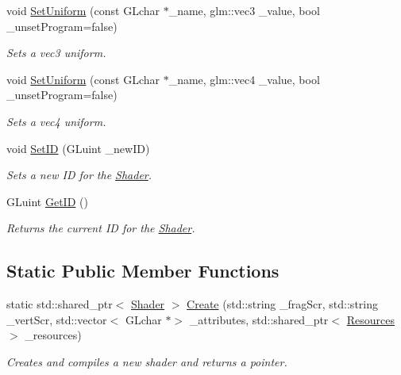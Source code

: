 \begin{DoxyCompactItemize}
void \hyperlink{classfrontier_1_1_shader_aad5527a4747c3dc7692a8cdaede42537}{Set\+Uniform} (const G\+Lchar $\ast$\+\_\+name, glm\+::vec3 \+\_\+value, bool \+\_\+unset\+Program=false)
\begin{DoxyCompactList}\small\item\em Sets a vec3 uniform. \end{DoxyCompactList}\item 
void \hyperlink{classfrontier_1_1_shader_a2f1cc89390360779c0df68f2d10efff1}{Set\+Uniform} (const G\+Lchar $\ast$\+\_\+name, glm\+::vec4 \+\_\+value, bool \+\_\+unset\+Program=false)
\begin{DoxyCompactList}\small\item\em Sets a vec4 uniform. \end{DoxyCompactList}\item 
void \hyperlink{classfrontier_1_1_shader_a2485d4542cb287c9831558ed1cbd0d13}{Set\+ID} (G\+Luint \+\_\+new\+ID)
\begin{DoxyCompactList}\small\item\em Sets a new ID for the \hyperlink{classfrontier_1_1_shader}{Shader}. \end{DoxyCompactList}\item 
G\+Luint \hyperlink{classfrontier_1_1_shader_a3536975966e61e614e544d1bba702383}{Get\+ID} ()
\begin{DoxyCompactList}\small\item\em Returns the current ID for the \hyperlink{classfrontier_1_1_shader}{Shader}. \end{DoxyCompactList}\end{DoxyCompactItemize}
\subsection*{Static Public Member Functions}
\begin{DoxyCompactItemize}
\item 
static std\+::shared\+\_\+ptr$<$ \hyperlink{classfrontier_1_1_shader}{Shader} $>$ \hyperlink{classfrontier_1_1_shader_add4c33f617fa62cc1d0757a875bacd01}{Create} (std\+::string \+\_\+frag\+Scr, std\+::string \+\_\+vert\+Scr, std\+::vector$<$ G\+Lchar $\ast$$>$ \+\_\+attributes, std\+::shared\+\_\+ptr$<$ \hyperlink{classfrontier_1_1_resources}{Resources} $>$ \+\_\+resources)
\begin{DoxyCompactList}\small\item\em Creates and compiles a new shader and returns a pointer. \end{DoxyCompactList}\end{DoxyCompactItemize}


